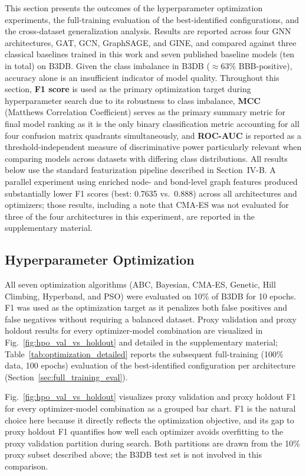 \documentclass[conference]{IEEEtran}
\begin{document}
This section presents the outcomes of the hyperparameter optimization
experiments, the full-training evaluation of the best-identified
configurations, and the cross-dataset generalization analysis. Results
are reported across four GNN architectures, GAT, GCN, GraphSAGE,
and GINE, and compared against three classical baselines trained in this
work and seven published baseline models (ten in total) on B3DB.
Given the class imbalance in B3DB ($\approx$63\% BBB-positive),
accuracy alone is an insufficient indicator of model quality.
Throughout this section, \textbf{F1 score} is used as the primary
optimization target during hyperparameter search due to its robustness
to class imbalance, \textbf{MCC} (Matthews Correlation Coefficient) serves as the primary summary metric
for final model ranking as it is the only binary classification metric
accounting for all four confusion matrix quadrants simultaneously, and
\textbf{ROC-AUC} is reported as a threshold-independent measure of
discriminative power particularly relevant when comparing models across
datasets with differing class distributions.
All results below use the standard featurization pipeline described in
Section~IV-B. A parallel experiment using enriched node- and
bond-level graph features produced substantially lower F1 scores
(best: 0.7635 vs.\ 0.888) across all architectures and optimizers;
those results, including a note that CMA-ES was not evaluated for
three of the four architectures in this experiment, are reported in
the supplementary material.

\subsection{Hyperparameter Optimization}

All seven optimization algorithms (ABC, Bayesian, CMA-ES, Genetic,
Hill Climbing, Hyperband, and PSO) were evaluated on 10\% of B3DB for
10 epochs. F1 was used as the optimization target as it penalizes both
false positives and false negatives without requiring a balanced
dataset. Proxy validation and proxy holdout results for every
optimizer-model combination are visualized in
Fig.~\ref{fig:hpo_val_vs_holdout} and detailed in the supplementary
material; Table~\ref{tab:optimization_detailed} reports the subsequent
full-training (100\% data, 100 epochs) evaluation of the
best-identified configuration per architecture
(Section~\ref{sec:full_training_eval}).


Fig.~\ref{fig:hpo_val_vs_holdout} visualizes proxy validation and proxy
holdout F1 for every optimizer-model combination as a grouped bar
chart. F1 is the natural choice here because it directly reflects the
optimization objective, and its gap to proxy holdout F1 quantifies how
well each optimizer avoids overfitting to the proxy validation
partition during search. Both partitions are drawn from the 10\%
proxy subset described above; the B3DB test set is not involved in
this comparison.
\end{document}
